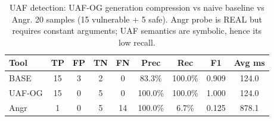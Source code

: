 \begin{table}[t]
\centering
\caption{UAF detection: UAF-OG generation compression vs naive baseline vs Angr. 20 samples (15 vulnerable + 5 safe). Angr probe is REAL but requires constant arguments; UAF semantics are symbolic, hence its low recall.}
\label{tab:uaf-og}
\begin{tabular}{lcccccccc}
\toprule
Tool & TP & FP & TN & FN & Prec & Rec & F1 & Avg ms \\
\midrule
BASE & 15 & 3 & 2 & 0 & 83.3\% & 100.0\% & 0.909 & 124.0 \\
UAF-OG & 15 & 0 & 5 & 0 & 100.0\% & 100.0\% & 1.000 & 124.0 \\
Angr & 1 & 0 & 5 & 14 & 100.0\% & 6.7\% & 0.125 & 878.1 \\
\bottomrule
\end{tabular}
\end{table}
